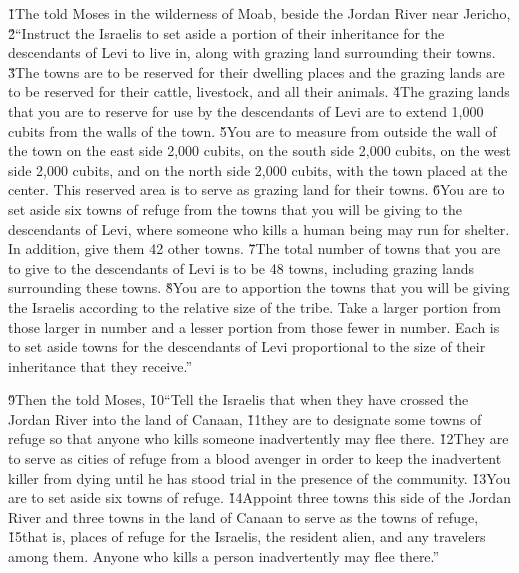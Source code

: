 \v{1}The  told Moses in the wilderness of Moab, beside the Jordan River near Jericho, \v{2}``Instruct the Israelis to set aside a portion of their inheritance for the descendants of Levi to live in, along with grazing land surrounding their towns. \v{3}The towns are to be reserved for their dwelling places and the grazing lands are to be reserved for their cattle, livestock, and all their animals. \v{4}The grazing lands that you are to reserve for use by the descendants of Levi are to extend 1,000 cubits from the walls of the town. \v{5}You are to measure from outside the wall of the town on the east side 2,000 cubits, on the south side 2,000 cubits, on the west side 2,000 cubits, and on the north side 2,000 cubits, with the town placed at the center. This reserved area is to serve as grazing land for their towns. \v{6}You are to set aside six towns of refuge from the towns that you will be giving to the descendants of Levi, where someone who kills a human being may run for shelter. In addition, give them 42 other towns. \v{7}The total number of towns that you are to give to the descendants of Levi is to be 48 towns, including grazing lands surrounding these towns. \v{8}You are to apportion the towns that you will be giving the Israelis according to the relative size of the tribe. Take a larger portion from those larger in number and a lesser portion from those fewer in number. Each is to set aside towns for the descendants of Levi proportional to the size of their inheritance that they receive.''

\v{9}Then the  told Moses, \v{10}``Tell the Israelis that when they have crossed the Jordan River into the land of Canaan, \v{11}they are to designate some towns of refuge so that anyone who kills someone inadvertently may flee there. \v{12}They are to serve as cities of refuge from a blood avenger in order to keep the inadvertent killer from dying until he has stood trial in the presence of the community. \v{13}You are to set aside six towns of refuge. \v{14}Appoint three towns this side of the Jordan River and three towns in the land of Canaan to serve as the towns of refuge, \v{15}that is, places of refuge for the Israelis, the resident alien, and any travelers among them. Anyone who kills a person inadvertently may flee there.''

